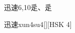 \begin{entry}{迅速}{6,10}{⾡、⾡}
  \begin{phonetics}{迅速}{xun4su4}[][HSK 4]
  \end{phonetics}
\end{entry}
